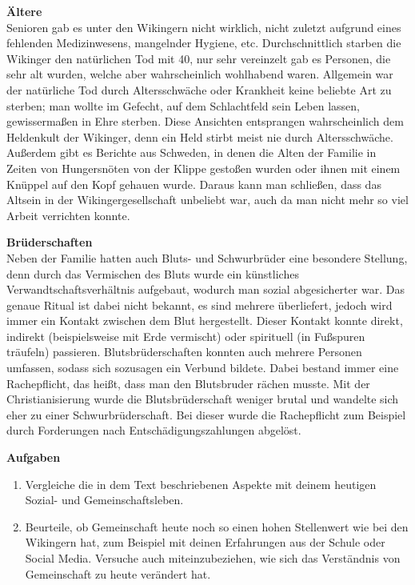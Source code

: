 \documentclass[12pt,a4paper,ngerman,openany]{book}
\newcommand{\aufgaben}[1]{
  \begin{tcolorbox}
    \textbf{Aufgaben}
    \begin{enumerate}
      #1
    \end{enumerate}
  \end{tcolorbox}
} %
\begin{document}
\textbf{Ältere}\\
Senioren gab es unter den Wikingern nicht wirklich, nicht zuletzt aufgrund eines
fehlenden Medizinwesens, mangelnder Hygiene, etc. Durchschnittlich starben die Wikinger
den natürlichen Tod mit 40, nur sehr vereinzelt gab es Personen, die sehr alt wurden, welche aber wahrscheinlich wohlhabend waren. Allgemein war der natürliche Tod durch Altersschwäche oder Krankheit keine beliebte Art zu sterben; man wollte im Gefecht, auf dem Schlachtfeld sein Leben lassen, gewissermaßen \glqq in Ehre\grqq{} sterben. Diese Ansichten entsprangen wahrscheinlich dem Heldenkult der Wikinger, denn ein Held stirbt meist nie durch Altersschwäche. Außerdem gibt es Berichte aus Schweden, in denen die Alten der Familie in Zeiten von Hungersnöten von der Klippe gestoßen wurden oder ihnen mit einem Knüppel auf den Kopf gehauen wurde. Daraus kann man schließen, dass das \glqq Altsein\grqq{} in der Wikingergesellschaft unbeliebt war, auch da man nicht mehr so viel Arbeit verrichten konnte.

\textbf{Brüderschaften}\\
Neben der Familie hatten auch Bluts- und Schwurbrüder eine besondere Stellung, denn
durch das Vermischen des Bluts wurde ein künstliches Verwandtschaftsverhältnis aufgebaut,
wodurch man sozial abgesicherter war. Das genaue Ritual ist dabei nicht bekannt, es sind mehrere überliefert, jedoch wird immer ein Kontakt zwischen dem Blut hergestellt. Dieser Kontakt konnte direkt, indirekt (beispielsweise mit Erde vermischt) oder spirituell (in Fußspuren träufeln) passieren. Blutsbrüderschaften konnten auch mehrere Personen umfassen, sodass sich sozusagen ein Verbund bildete.
Dabei bestand immer eine Rachepflicht, das heißt, dass man den Blutsbruder rächen musste. Mit der Christianisierung wurde die Blutsbrüderschaft weniger brutal und wandelte sich eher zu einer Schwurbrüderschaft. Bei dieser wurde die Rachepflicht zum Beispiel durch Forderungen nach Entschädigungszahlungen abgelöst.

\vspace{0.66cm}

\aufgaben{
  \item Vergleiche die in dem Text beschriebenen Aspekte mit deinem heutigen Sozial- und Gemeinschaftsleben.
  \item Beurteile, ob \glqq Gemeinschaft\grqq{} heute noch so einen hohen Stellenwert wie bei den Wikingern hat, zum Beispiel mit deinen Erfahrungen aus der Schule oder Social Media. Versuche auch miteinzubeziehen, wie sich das Verständnis von Gemeinschaft zu heute verändert hat.
}
\end{document}
